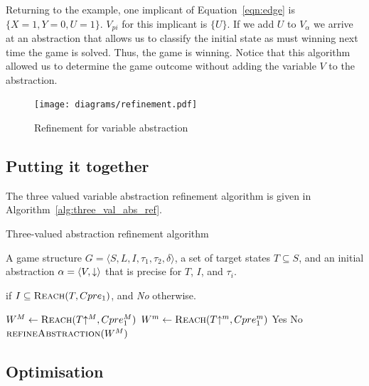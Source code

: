Returning to the example, one implicant of Equation~\ref{eqn:edge} is $\{X=1, Y=0, U=1\}$. $V_{pi}$ for this implicant is $\{U\}$. If we add $U$ to $V_\alpha$ we arrive at an abstraction that allows us to classify the initial state as must winning next time the game is solved. Thus, the game is winning. Notice that this algorithm allowed us to determine the game outcome without adding the variable $V$ to the abstraction. 

\begin{figure}[t]
\centering
\texttt{[image: diagrams/refinement.pdf]}
\caption{Refinement for variable abstraction}
\label{fig:var_refinement}
\end{figure}

\subsection{Putting it together}
The three valued variable abstraction refinement algorithm is given in Algorithm~\ref{alg:three_val_abs_ref}.

\begin{algorithm}
\caption{Three-valued abstraction refinement algorithm}
\label{alg:three_val_abs_ref}

\begin{algorithmic}[1]

\Require A game structure $G = \langle S, L, I, \tau_1, \tau_2, \delta \rangle$, a set 
of target states $T\subseteq S$, and an initial abstraction $\alpha=\langle V, \mathord{\downarrow} \rangle$
that is precise for $T$, $I$, and $\tau_i$.

 if $I \subseteq \textsc{Reach}(T, Cpre_1)$, and {\it No} otherwise.


    \Loop
        \State $W^M \gets \textsc{Reach}(T\mathord{\uparrow^M}, Cpre_1^M)$
        \State $W^m \gets \textsc{Reach}(T\mathord{\uparrow^m}, Cpre_1^m)$
            \State\Return Yes
            \State\Return No
        \Else       
            \State$\Call{refineAbstraction}{W^M}$
        \EndIf
    \EndLoop
\EndFunction

\end{algorithmic}
\end{algorithm}

\subsection{Optimisation}

